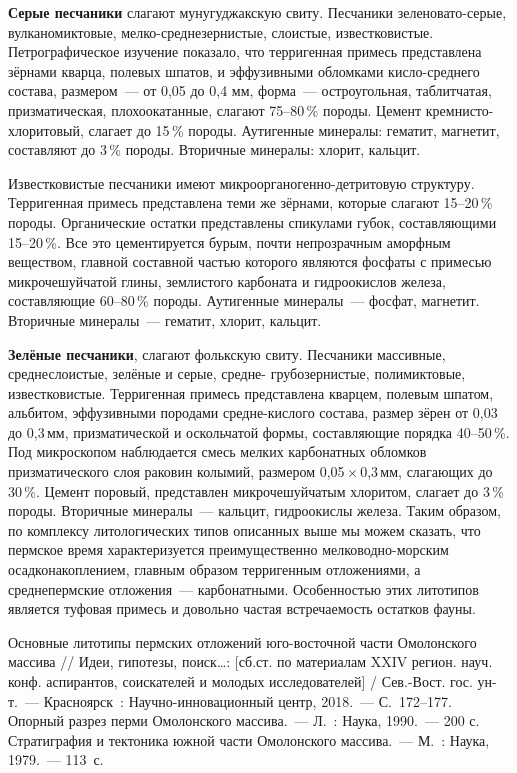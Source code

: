 \textbf{Серые песчаники} слагают мунугуджакскую свиту. Песчаники зе\-ле\-но\-ва\-то-серые, вулканомиктовые, мелко-среднезернистые, слоистые, известковистые. Петрографическое изучение показало, что терригенная примесь представлена зёрнами кварца, полевых шпатов, и эффузивными обломками кисло-среднего состава, размером~--- от 0,05 до 0,4 мм, форма~--- остроугольная, таблитчатая, призматическая, плохоокатанные, слагают 75--80\,\% породы. Цемент кремнисто-хлоритовый, слагает до 15\,\% породы. Аутигенные минералы: гематит, магнетит, составляют до 3\,\% породы. Вторичные минералы: хлорит, кальцит.

Известковистые песчаники имеют микроорганогенно-детритовую структуру. Терригенная примесь представлена теми же зёрнами, которые слагают 15--20\,\% породы. Органические остатки представлены спикулами губок, составляющими 15--20\,\%. Все это цементируется бурым, почти непрозрачным аморфным веществом, главной составной частью которого являются фосфаты с примесью микрочешуйчатой глины, землистого карбоната и гидроокислов железа, составляющие 60--80\,\% породы. Аутигенные минералы~--- фосфат, магнетит. Вторичные минералы~--- гематит, хлорит, кальцит.

\textbf{Зелёные песчаники}, слагают фолькскую свиту. Песчаники массивные, среднеслоистые, зелёные и серые, средне- грубозернистые, полимиктовые, известковистые. Терригенная примесь представлена кварцем, полевым шпатом, альбитом, эффузивными породами средне-кислого состава, размер зёрен от 0,03 до 0,3\,мм, призматической и оскольчатой формы, составляющие порядка 40--50\,\%. Под микроскопом наблюдается смесь мелких карбонатных обломков призматического слоя раковин колымий, размером 0,05\,$\times$\,0,3\,мм, слагающих до 30\,\%. Цемент поровый, представлен микрочешуйчатым хлоритом, слагает до 3\,\% породы. Вторичные минералы~--- кальцит, гидроокислы железа.
\clearpage
Таким образом, по комплексу литологических типов описанных выше мы можем сказать, что пермское время характеризуется преимущественно мелководно-морским осадконакоплением, главным образом терригенным отложениями, а среднепермские отложения~--- карбонатными. Особенностью этих литотипов является туфовая примесь и довольно частая встречаемость остатков фауны.

\begin{thebibliography}{99}
\bibitem{} Основные литотипы пермских отложений юго-восточной части Омолонского массива // Идеи, гипотезы, поиск…: [сб.ст. по материалам XXIV регион. науч. конф. аспирантов, соискателей и молодых исследователей] / Сев.-Вост. гос. ун-т.~--- Красноярск~: Научно-инновационный центр, 2018.~--- С.~172--177.
\bibitem{} Опорный разрез перми Омолонского массива.~--- Л.~: Наука, 1990.~--- 200 с.
\bibitem{} Стратиграфия и тектоника южной части Омолонского массива.~--- М.~: Наука, 1979.~--- 113~с.
\end{thebibliography}
\thispagestyle{empty}
